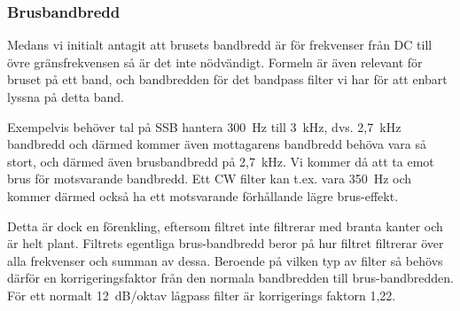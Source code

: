 \subsubsection{Brusbandbredd}
\begin{rev-nytt}[MAD]

Medans vi initialt antagit att brusets bandbredd är för frekvenser
från DC till övre gränsfrekvensen så är det inte nödvändigt. Formeln är även
relevant för bruset på ett band, och bandbredden för det bandpass filter vi har
för att enbart lyssna på detta band.

Exempelvis behöver tal på SSB hantera 300~Hz till 3~kHz, dvs. 2,7~kHz
bandbredd och därmed kommer även mottagarens bandbredd behöva vara så stort,
och därmed även brusbandbredd på 2,7~kHz. Vi kommer då att ta emot brus för
motsvarande bandbredd. Ett CW filter kan t.ex. vara 350~Hz och kommer därmed
också ha ett motsvarande förhållande lägre brus-effekt.

Detta är dock en förenkling, eftersom filtret inte filtrerar med branta kanter
och är helt plant. Filtrets egentliga brus-bandbredd beror på hur filtret
filtrerar över alla frekvenser och summan av dessa. Beroende på vilken typ av
filter så behövs därför en korrigeringsfaktor från den normala bandbredden
till brus-bandbredden. För ett normalt 12~dB/oktav lågpass filter är
korrigerings faktorn 1,22.

\end{rev-nytt}
